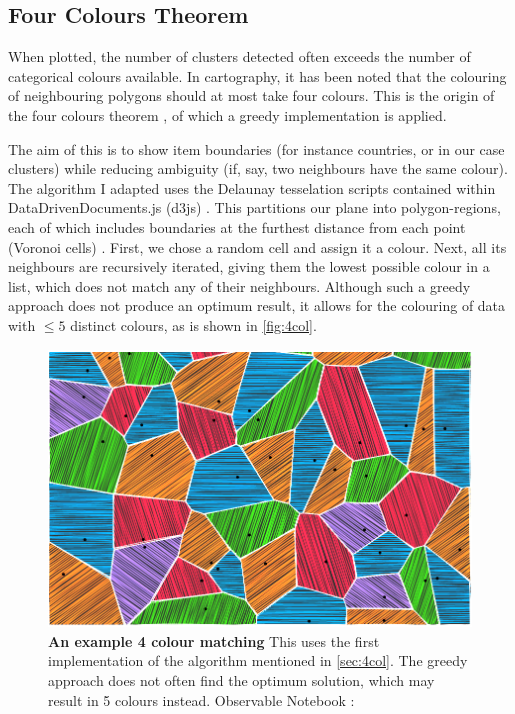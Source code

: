\subsection{Four Colours Theorem}\label{sec:4col}
When plotted, the number of clusters detected often exceeds the number of categorical colours available. In cartography, it has been noted that the colouring of neighbouring polygons should at most take four colours. This is the origin of the four colours theorem \cite{fourcolour}, of which a greedy implementation is applied.

The aim of this is to show item boundaries (for instance countries, or in our case clusters) while reducing ambiguity (if, say, two neighbours have the same colour). The algorithm I adapted uses the Delaunay tesselation scripts contained within DataDrivenDocuments.js (d3js) \cite{d3js}. This partitions our plane into polygon-regions, each of which includes boundaries at the furthest distance from each point (Voronoi cells) \cite{delaunay}. First, we chose a random cell and assign it a colour.
Next, all its neighbours are recursively iterated, giving them the lowest possible colour in a list, which does not match any of their neighbours. Although such a greedy approach does not produce an optimum result, it allows for the colouring of data with $\le 5$ distinct colours, as is shown in \autoref{fig:4col}.


\begin{figure}[H]
  \centering
\includegraphics[width=.8\textwidth]{4fig/4col.png}
\caption{\textbf{An example 4 colour matching} This uses the first implementation of the algorithm mentioned in \autoref{sec:4col}. The greedy approach does not often find the optimum solution, which may result in 5 colours instead. Observable Notebook : \cite{w4colobs}}\label{fig:4col}
\end{figure}


